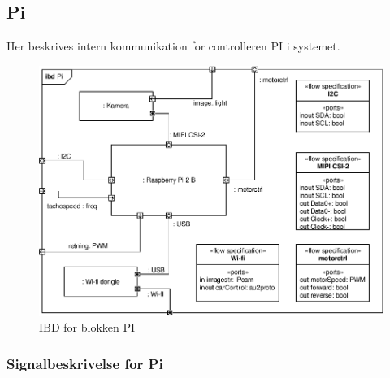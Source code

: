 \subsection{Pi}

Her beskrives intern kommunikation for controlleren PI i systemet. 

\begin{figure}[h]
\centering
\includegraphics[scale=1]{../fig/diagrammer/bil/ibd_pi.pdf}
\caption{IBD for blokken PI}
\label{fig:ibd_pi}
\end{figure}


\subsubsection{Signalbeskrivelse for Pi}

